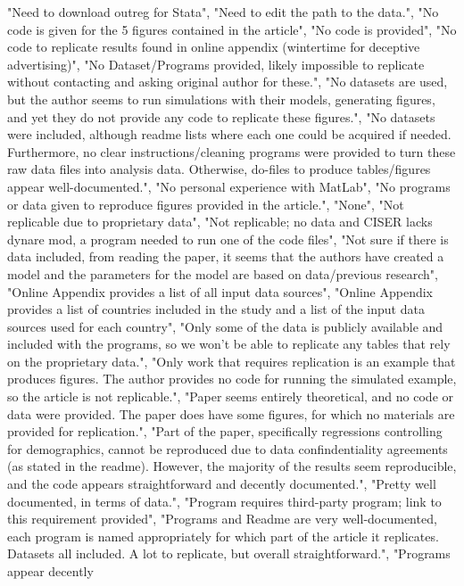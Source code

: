 \documentclass[]{article}
\begin{document}
\begin{itemize}
  "Need to download outreg for Stata", "Need to edit the path to the
  data.", "No code is given for the 5 figures contained in the article",
  "No code is provided", "No code to replicate results found in online
  appendix (wintertime for deceptive advertising)", "No Dataset/Programs
  provided, likely impossible to replicate without contacting and asking
  original author for these.", "No datasets are used, but the author
  seems to run simulations with their models, generating figures, and
  yet they do not provide any code to replicate these figures.", "No
  datasets were included, although readme lists where each one could be
  acquired if needed. Furthermore, no clear instructions/cleaning
  programs were provided to turn these raw data files into analysis
  data. Otherwise, do-files to produce tables/figures appear
  well-documented.", "No personal experience with MatLab", "No programs
  or data given to reproduce figures provided in the article.", "None",
  "Not replicable due to proprietary data", "Not replicable; no data and
  CISER lacks dynare mod, a program needed to run one of the code
  files", "Not sure if there is data included, from reading the paper,
  it seems that the authors have created a model and the parameters for
  the model are based on data/previous research", "Online Appendix
  provides a list of all input data sources", "Online Appendix provides
  a list of countries included in the study and a list of the input data
  sources used for each country", "Only some of the data is publicly
  available and included with the programs, so we won't be able to
  replicate any tables that rely on the proprietary data.", "Only work
  that requires replication is an example that produces figures. The
  author provides no code for running the simulated example, so the
  article is not replicable.", "Paper seems entirely theoretical, and no
  code or data were provided. The paper does have some figures, for
  which no materials are provided for replication.", "Part of the paper,
  specifically regressions controlling for demographics, cannot be
  reproduced due to data confindentiality agreements (as stated in the
  readme). However, the majority of the results seem reproducible, and
  the code appears straightforward and decently documented.", "Pretty
  well documented, in terms of data.", "Program requires third-party
  program; link to this requirement provided", "Programs and Readme are
  very well-documented, each program is named appropriately for which
  part of the article it replicates. Datasets all included. A lot to
  replicate, but overall straightforward.", "Programs appear decently

\end{itemize}
\end{document}
